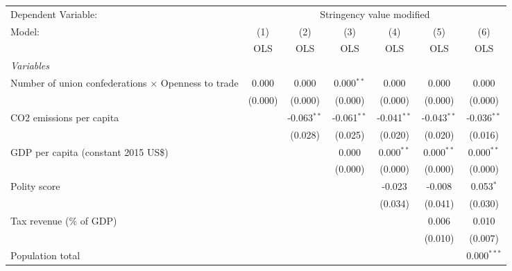 
\begingroup
\centering
\begin{tabular}{lcccccc}
   \toprule
   Dependent Variable: & \multicolumn{6}{c}{Stringency value modified}\\
   Model:                                                     & (1)     & (2)           & (3)           & (4)           & (5)           & (6)\\  
                                                              &  OLS    & OLS           & OLS           & OLS           & OLS           & OLS\\  
   \midrule
   \emph{Variables}\\
   Number of union confederations $\times$ Openness to trade  & 0.000   & 0.000         & 0.000$^{**}$  & 0.000         & 0.000         & 0.000\\   
                                                              & (0.000) & (0.000)       & (0.000)       & (0.000)       & (0.000)       & (0.000)\\   
   CO2 emissions per capita                                   &         & -0.063$^{**}$ & -0.061$^{**}$ & -0.041$^{**}$ & -0.043$^{**}$ & -0.036$^{**}$\\   
                                                              &         & (0.028)       & (0.025)       & (0.020)       & (0.020)       & (0.016)\\   
   GDP per capita (constant 2015 US\$)                        &         &               & 0.000         & 0.000$^{**}$  & 0.000$^{**}$  & 0.000$^{**}$\\   
                                                              &         &               & (0.000)       & (0.000)       & (0.000)       & (0.000)\\   
   Polity score                                               &         &               &               & -0.023        & -0.008        & 0.053$^{*}$\\   
                                                              &         &               &               & (0.034)       & (0.041)       & (0.030)\\   
   Tax revenue (\% of GDP)                                    &         &               &               &               & 0.006         & 0.010\\   
                                                              &         &               &               &               & (0.010)       & (0.007)\\   
   Population total                                           &         &               &               &               &               & 0.000$^{***}$\\   

\end{tabular}
